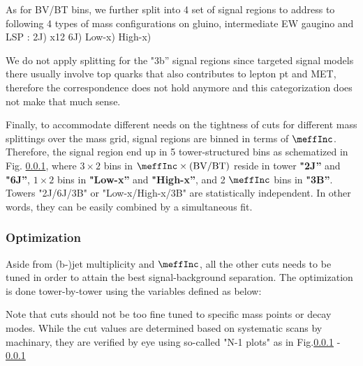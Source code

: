 
As for BV/BT bins, we further split into 4 set of signal regions to address to following 4 types of mass configurations on gluino, intermediate EW gaugino and LSP :
2J) x12
6J)
Low-x)
High-x)

We do not apply splitting for the "3b'' signal regions since targeted signal models there usually involve top quarks that also contributes to lepton pt and MET, therefore the correspondence does not hold anymore and this categorization does not make that much sense.

Finally, to accommodate different needs on the tightness of cuts for different mass splittings over the mass grid, signal regions are binned in terms of $\meffInc$. 
Therefore, the signal region end up in 5 tower-structured bins as schematized in Fig. \ref{}, where $3 \times 2$ bins in $\meffInc \times \mathrm{(BV/BT)}$ reside in tower \textbf{"2J''} and \textbf{"6J''}, $1 \times 2$ bins in \textbf{"Low-x''} and \textbf{"High-x''}, and 2 $\meffInc$ bins in \textbf{"3B''}. Towers "2J/6J/3B" or "Low-x/High-x/3B" are statistically independent. In other words, they can be easily combined by a simultaneous fit. 

		
		
\subsubsection{Optimization}
Aside from (b-)jet multiplicity and $\meffInc$, all the other cuts needs to be tuned in order to attain the best signal-background separation. The optimization is done tower-by-tower using the variables defined as below:


Note that cuts should not be too fine tuned to specific mass points or decay modes. While the cut values are determined based on systematic scans by machinary, they are verified by eye using so-called "N-1 plots" as in Fig.\ref{} - \ref{}  %


